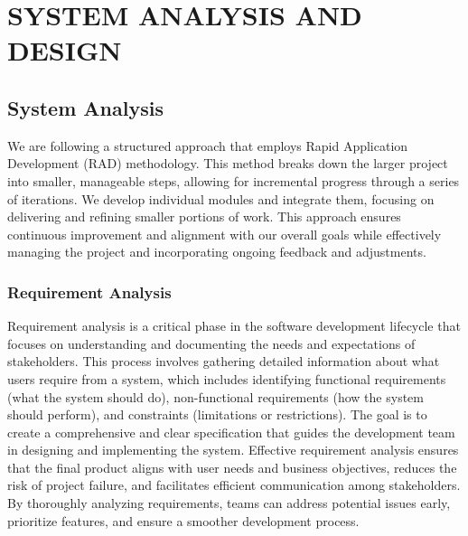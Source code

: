 \chapter{SYSTEM ANALYSIS AND DESIGN}
\section{System Analysis}
We are following a structured approach that employs Rapid Application Development (RAD) methodology. This method breaks down the larger project into smaller, manageable steps, allowing for incremental progress through a series of iterations. We develop individual modules and integrate them, focusing on delivering and refining smaller portions of work. This approach ensures continuous improvement and alignment with our overall goals while effectively managing the project and incorporating ongoing feedback and adjustments.
\subsection{Requirement Analysis}
Requirement analysis is a critical phase in the software development lifecycle that focuses on understanding and documenting the needs and expectations of stakeholders. This process involves gathering detailed information about what users require from a system, which includes identifying functional requirements (what the system should do), non-functional requirements (how the system should perform), and constraints (limitations or restrictions). The goal is to create a comprehensive and clear specification that guides the development team in designing and implementing the system. Effective requirement analysis ensures that the final product aligns with user needs and business objectives, reduces the risk of project failure, and facilitates efficient communication among stakeholders. By thoroughly analyzing requirements, teams can address potential issues early, prioritize features, and ensure a smoother development process.
